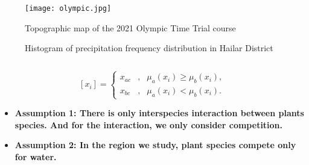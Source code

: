 \begin{figure}[h]
	\centering
	\texttt{[image: olympic.jpg]}
	\caption{Topographic map of the  2021 Olympic Time Trial course} 
	\label{key}
\end{figure}

\begin{figure}[h]
	\centering
	\label{histo1}
	\label{histo2}
	\caption{Histogram of precipitation frequency distribution in Hailar District} 
\end{figure}

\begin{equation}
	\label{eq3}
\end{equation}

\begin{equation}
	\label{eq6}
	[x_{i}]=\left\{
	\begin{aligned}
		x_{ac} & , & \mu_{a}(x_{i})\geq \mu_{b}(x_{i}), \\
		x_{bc} & , & \mu_{a}(x_{i})< \mu_{b}(x_{i}).
	\end{aligned}
	\right.
\end{equation}

\begin{itemize}
	\item \textbf{Assumption 1: There is only interspecies interaction between plants species. And for the interaction, we only consider competition.}\,
	
	\item \textbf{Assumption 2: In the region we study, plant species compete only for water.}\,
	
\end{itemize}